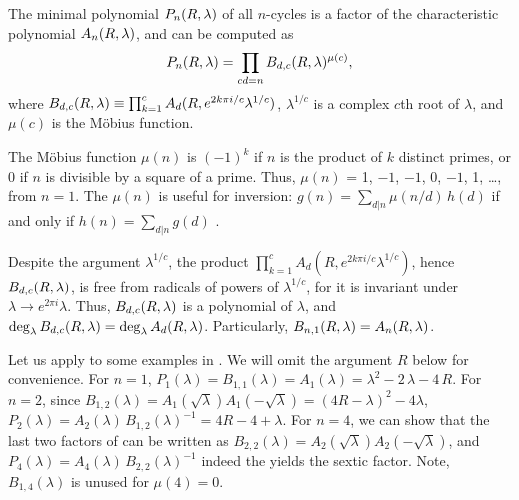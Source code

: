 \documentclass{ws-ijbc}
\begin{document}
\begin{theorem}
  The minimal polynomial $P_n(R, \lambda)$ of all $n$-cycles
  is a factor of the characteristic polynomial $A_n(R, \lambda)$,
  and can be computed as
  \begin{equation}
    P_n(R, \lambda)
    = \prod_{cd = n} B_{d,c}(R, \lambda)^{\mu(c)},
  \label{eq:primfac}
  \end{equation}
where
  $B_{d, c}(R, \lambda) \equiv \prod_{k=1}^c A_{d}(R, e^{2k\pi i/c} \lambda^{1/c})$,
  $\lambda^{1/c}$ is a complex $c$th root of $\lambda$,
  and $\mu(c)$ is the M\"obius function.
  \label{thm:primfac}
\end{theorem}
%
%
\begin{remark}
The M\"obius function $\mu(n)$ is $(-1)^k$
  if $n$ is the product of $k$ distinct primes,
  or 0 if $n$ is divisible by a square of a prime.
Thus, $\mu(n)$ = 1, $-1$, $-1$, 0, $-1$, 1, \ldots,
  from $n = 1$.
The $\mu(n)$ is useful for inversion:
$g(n) = \sum_{d|n} \mu(n/d) \, h(d)$
if and only if $h(n) = \sum_{d|n} g(d)$
\cite{hardy}.
\end{remark}
%
%
\begin{remark}
Despite the argument $\lambda^{1/c}$,
  the product $\prod_{k=1}^c A_d(R, e^{2k\pi i/c} \lambda^{1/c})$,
  hence $B_{d,c}(R, \lambda)$,
  is free from radicals of powers of $\lambda^{1/c}$,
  for it is invariant under $\lambda \rightarrow e^{2\pi i} \lambda$.
Thus, $B_{d, c}(R, \lambda)$ is a polynomial of $\lambda$,
and $\deg_\lambda B_{d,c}(R, \lambda) = \deg_\lambda A_d(R, \lambda)$.
Particularly, $B_{n,1}(R, \lambda) = A_n(R, \lambda)$.
\end{remark}
%
%
%
%
Let us apply 
to some examples in .
We will omit the argument $R$ below for convenience.
For $n = 1$,
$P_1(\lambda) = B_{1,1}(\lambda) = A_1(\lambda)
  = \lambda^2 - 2\,\lambda - 4\,R$.
%
%
%
For $n = 2$, since
$B_{1,2}(\lambda)
=
A_1(\sqrt{\lambda})
A_1(-\sqrt{\lambda})
=
(4R-\lambda)^2 -4\lambda$,
%
$P_2(\lambda) = A_2(\lambda) \, B_{1,2}(\lambda)^{-1} = 4R - 4 + \lambda$.
%
%
For $n = 4$,
we can show that
the last two factors of 
can be written as
$B_{2,2}(\lambda) = A_2(\sqrt{\lambda}) A_2(-\sqrt{\lambda})$,
and
%
$P_4(\lambda)
    = A_4(\lambda) \, B_{2,2}(\lambda)^{-1}$
indeed the yields the sextic factor.
Note, $B_{1,4}(\lambda)$ is unused for $\mu(4) = 0$.
\end{document}
